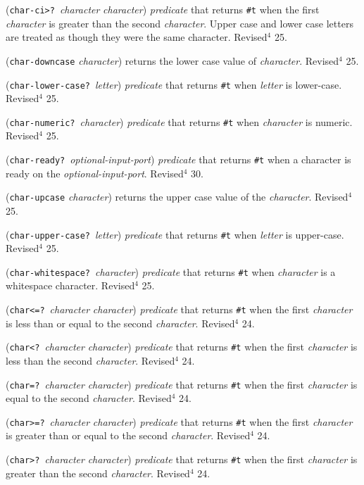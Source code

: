 \documentclass[10pt,twocolumn]{article}
\begin{document}
(\texttt{char-ci>?}\ \emph{character} \emph{character}) \emph{predicate} that
returns \texttt{\#t} when the first \emph{character} is greater than the
second \emph{character}. Upper case and lower case letters are treated
as though they were the same character. Revised$^4$ 25.

(\texttt{char-downcase} \emph{character}) returns the lower case value of
\emph{character}.  Revised$^4$ 25.

(\texttt{char-lower-case?}\ \emph{letter}) \emph{predicate} that returns
\texttt{\#t} when \emph{letter} is lower-case.  Revised$^4$ 25.

(\texttt{char-numeric?}\ \emph{character}) \emph{predicate} that returns
\texttt{\#t} when \emph{character} is numeric.  Revised$^4$ 25.

(\texttt{char-ready?}\ \emph{optional-input-port}) \emph{predicate} that returns
\texttt{\#t} when a character is ready on the \emph{optional-input-port}.
Revised$^4$ 30.

(\texttt{char-upcase} \emph{character}) returns the upper case value of the
\emph{character}.  Revised$^4$ 25.

(\texttt{char-upper-case?}\ \emph{letter}) \emph{predicate} that returns
\texttt{\#t} when \emph{letter} is upper-case.  Revised$^4$ 25.

(\texttt{char-whitespace?}\ \emph{character}) \emph{predicate} that
returns \texttt{\#t} when \emph{character} is a whitespace character.
Revised$^4$ 25.

(\texttt{char<=?}\ \emph{character} \emph{character}) \emph{predicate} that
returns \texttt{\#t} when the first \emph{character} is less than or equal to
the second \emph{character}.  Revised$^4$ 24.

(\texttt{char<?}\ \emph{character} \emph{character}) \emph{predicate} that
returns \texttt{\#t} when the first \emph{character} is less than the second
\emph{character}.  Revised$^4$ 24.

(\texttt{char=?}\ \emph{character} \emph{character}) \emph{predicate} that
returns \texttt{\#t} when the first \emph{character} is equal to the second
\emph{character}.  Revised$^4$ 24.

(\texttt{char>=?}\ \emph{character} \emph{character}) \emph{predicate} that
returns \texttt{\#t} when the first \emph{character} is greater than or equal
to the second \emph{character}.  Revised$^4$ 24.

(\texttt{char>?}\ \emph{character} \emph{character}) \emph{predicate} that
returns \texttt{\#t} when the first \emph{character} is greater than the
second \emph{character}.  Revised$^4$ 24.
\end{document}
